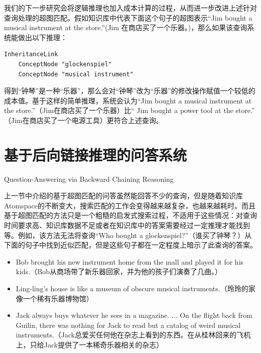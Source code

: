 {\begin{tiny}
\begin{lstlisting}
\end{lstlisting}\end{tiny}}

我们的下一步研究会将逻辑推理也加入成本计算的过程，从而进一步改进上述针对查询处理的超图匹配。假如知识库中代表下面这个句子的超图表示“Jim bought a musical instrument at the store.”(Jim 在商店买了一个乐器。)，那么如果该查询系统能做出以下推理：

\begin{verbatim}
InheritanceLink
	ConceptNode "glockenspiel"
	ConceptNode "musical instrument"
\end{verbatim}

得到“钟琴”是一种“乐器”，那么会对“钟琴”改为“乐器”的修改操作赋值一个较低的成本值。基于这样的简单推理，系统会认为“Jim bought a musical instrument at the store.”（Jim在商店买了一个乐器）比“ Jim bought a power tool at the store.” （Jim在商店买了一个电源工具）更符合上述查询。

\section{基于后向链接推理的问答系统}{Question-Answering via Backward Chaining Reasoning}
\label{sec:backward}

上一节中介绍的基于超图匹配的问答虽然能回答不少的查询，但是随着知识库Atomspace的不断变大，搜索匹配的工作会变得越来越复杂，也越来越耗时。而且基于超图匹配的方法只是一个粗糙的启发式搜索过程，不适用于这些情况：对查询时间要求高、知识库数据不足或者在知识库中的答案需要经过一定推理才能找到等。例如，该方法无法将查询“Who bought a glockenspiel?”（谁买了钟琴？）从下面的句子中找到近似匹配，但是这些句子都在一定程度上暗示了此查询的答案。

\begin{itemize}
\item Bob brought his new instrument home from the mall and played it for his kids.（Bob从商场带了新乐器回家，并为他的孩子们演奏了几曲。）
\item Ling-ling's house is like a museum of obscure musical instruments.（玲玲的家像一个稀有乐器博物馆）
\item Jack always buys whatever he sees in a magazine. ... On the flight back from Guilin, there was nothing for Jack to read but a catalog of weird musical instruments.（Jack总爱买任何他在杂志上看到的东西。在从桂林回来的飞机上，只给Jack提供了一本稀奇乐器相关的杂志）
\end{itemize}


